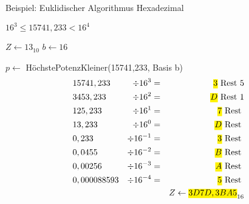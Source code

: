 \documentclass[a4paper]{scrartcl}
\begin{document}
				 	\begin{algorithm}[h]
				 		\caption{Beispiel: Euklidischer Algorithmus Hexadezimal}
				 		\DontPrintSemicolon
				 		
				 	
				 	\( 16^3 \leq 15741,233 < 16^4 \)
				 	
				 	\( Z \gets 13_{10} \) 
				 	\( b \gets 16 \) \;
				 	\BlankLine
				 	
				 	\( p \gets \) HöchstePotenzKleiner(15741,233, Basis b) 
				 	\BlankLine
				 	\begin{align*}
				 	&15741,233 &\div 16^3 &= &\text{\hl{$ 3 $} Rest } 5 \\
				 	&3453,233 &\div 16^2 &= &\text{\hl{$ D $} Rest } 1 \\
				 	&125,233 &\div 16^1 &= &\text{\hl{$ 7 $} Rest }  \\
				 	&13,233 &\div 16^0 &= &\text{\hl{$ D $} Rest }  \\
				 	&0,233 &\div 16^{-1} &= &\text{\hl{$ 3 $} Rest }  \\
				 	&0,0455 &\div 16^{-2} &= &\text{\hl{$ B $} Rest }  \\
				 	&0,00256 &\div 16^{-3} &= &\text{\hl{$ A $} Rest }  \\
				 	&0,000088593 &\div 16^{-4} &= &\text{\hl{$ 5 $} Rest }  \\
				 	&&&&Z \gets \text{\hl{$ 3D7D,3BA5 $}}_{16} 
				 	\end{align*}
				 	\end{algorithm}
			 	
\end{document}
